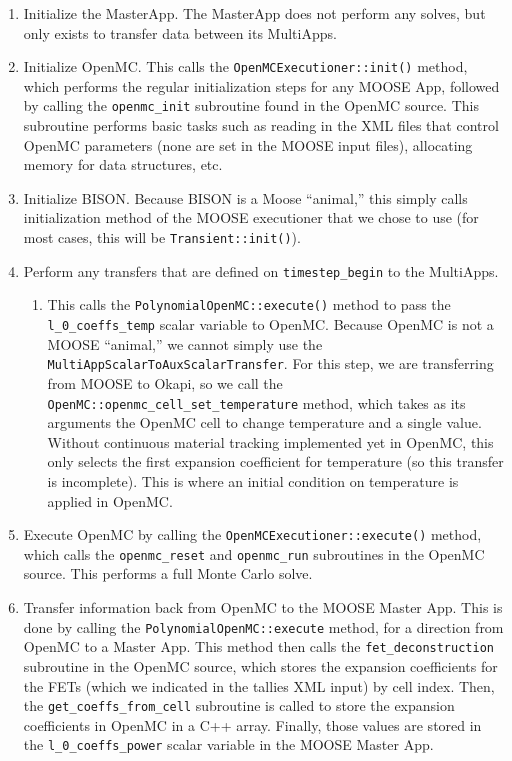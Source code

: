 \documentclass[10pt]{article}
\numberwithin{equation}{section} %
\begin{document}
\begin{enumerate}
\item Initialize the MasterApp. The MasterApp does not perform any solves, but only exists to transfer data between its MultiApps.
\item Initialize OpenMC. This calls the {\tt OpenMCExecutioner::init()} method, which performs the regular initialization steps for any MOOSE App, followed by calling the {\tt openmc\_init} subroutine found in the OpenMC source. This subroutine performs basic tasks such as reading in the XML files that control OpenMC parameters (none are set in the MOOSE input files), allocating memory for data structures, etc.
\item Initialize BISON. Because BISON is a Moose ``animal,'' this simply calls initialization method of the MOOSE executioner that we chose to use (for most cases, this will be {\tt Transient::init()}).
\item Perform any transfers that are defined on {\tt timestep\_begin} to the MultiApps. 
	\begin{enumerate}
	\item This calls the {\tt PolynomialOpenMC::execute()} method to pass the {\tt l\_0\_coeffs\_temp} scalar variable to OpenMC. Because OpenMC is not a MOOSE ``animal,'' we cannot simply use the {\tt MultiAppScalarToAuxScalarTransfer}. For this step, we are transferring from MOOSE to Okapi, so we call the {\tt OpenMC::openmc\_cell\_set\_temperature} method, which takes as its arguments the OpenMC cell to change temperature and a single value. Without continuous material tracking implemented yet in OpenMC, this only selects the first expansion coefficient for temperature (so this transfer is incomplete). This is where an initial condition on temperature is applied in OpenMC.
	\end{enumerate}
\item Execute OpenMC by calling the {\tt OpenMCExecutioner::execute()} method, which calls the {\tt openmc\_reset} and {\tt openmc\_run} subroutines in the OpenMC source. This performs a full Monte Carlo solve.
\item Transfer information back from OpenMC to the MOOSE Master App. This is done by calling the {\tt PolynomialOpenMC::execute} method, for a direction from OpenMC to a Master App. This method then calls the {\tt fet\_deconstruction} subroutine in the OpenMC source, which stores the expansion coefficients for the FETs (which we indicated in the tallies XML input) by cell index. Then, the {\tt get\_coeffs\_from\_cell} subroutine is called to store the expansion coefficients in OpenMC in a C++ array. Finally, those values are stored in the {\tt l\_0\_coeffs\_power} scalar variable in the MOOSE Master App.

\end{enumerate}
\end{document}
